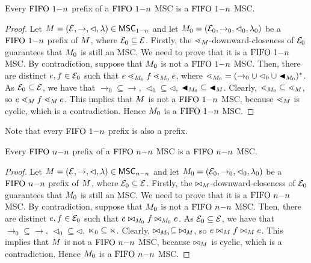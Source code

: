 \begin{lemma}
	\label{lem:onen-prefix}
	Every $\text{FIFO } 1\mathsf{-}n$ prefix of a $\text{FIFO } 1\mathsf{-}n$ MSC is a $\text{FIFO } 1\mathsf{-}n$ MSC.
\end{lemma}
\begin{proof}
	Let $M = (\mathcal{E}, \to, \lhd, \lambda) \in \mathsf{MSC}_{1\mathsf{-}n}$ and let $M_0 =
	(\mathcal{E}_0, \to_0, \lhd_0, \lambda_0)$ be a $\text{FIFO } 1\mathsf{-}n$ prefix of $M$, where $\mathcal{E}_0 \subseteq \mathcal{E}$. Firstly, the $\lessdot_M$-downward-closeness of $\mathcal{E}_0$ guarantees that ${M_0}$ is still an MSC. We need to prove that it is a $\text{FIFO } 1\mathsf{-}n$ MSC. By contradiction, suppose that $M_0$ is not a $\text{FIFO } 1\mathsf{-}n$ MSC. Then, there are distinct $e,f \in \mathcal{E}_0$ such that $e \lessdot_{M_0} f \lessdot_{M_0} e$, where $\lessdot_{M_0} = (\to_0 \cup \lhd_0 \cup \blacktriangleleft_{M_0})^\ast$. As $\mathcal{E}_0 \subseteq \mathcal{E}$, we have that ${\rightarrow_0} \subseteq {\rightarrow}$, ${\lhd_0} \subseteq {\lhd}$, ${\blacktriangleleft_{M_0}} \subseteq {\blacktriangleleft_M}$. Clearly, $\lessdot_{M_0} \subseteq \lessdot_M$, so $e \lessdot_M f \lessdot_M e$. This implies that $M$ is not a $\text{FIFO } 1\mathsf{-}n$ MSC, because $\lessdot_M$ is cyclic, which is a contradiction. Hence $M_0$ is a $\text{FIFO } 1\mathsf{-}n$ MSC.
\end{proof}

\noindent Note that every $\text{FIFO } 1\mathsf{-}n$ prefix is also a prefix.

\begin{lemma}
	\label{lem:nn-prefix}
	Every $\text{FIFO } n\mathsf{-}n$ prefix of a $\text{FIFO } n\mathsf{-}n$ MSC is a $\text{FIFO } n\mathsf{-}n$ MSC.
\end{lemma}
\begin{proof}
	Let $M = (\mathcal{E}, \to, \lhd, \lambda) \in \mathsf{MSC}_{n\mathsf{-}n}$ and let $M_0 =
	(\mathcal{E}_0, \to_0, \lhd_0, \lambda_0)$ be a $\text{FIFO } n\mathsf{-}n$ prefix of $M$, where $\mathcal{E}_0 \subseteq \mathcal{E}$. Firstly, the $\bowtie_M$-downward-closeness of $\mathcal{E}_0$ guarantees that ${M_0}$ is still an MSC. We need to prove that it is a $\text{FIFO } n\mathsf{-}n$ MSC. By contradiction, suppose that $M_0$ is not a $\text{FIFO } n\mathsf{-}n$ MSC. Then, there are distinct $e,f \in \mathcal{E}_0$ such that $e \bowtie_{M_0} f \bowtie_{M_0} e$. As $\mathcal{E}_0 \subseteq \mathcal{E}$, we have that ${\rightarrow_0} \subseteq {\rightarrow}$, ${\lhd_0} \subseteq {\lhd}$, ${\ltimes_0} \subseteq {\ltimes}$. Clearly, $\bowtie_{M_0} \subseteq\; \bowtie_M$, so $e \bowtie_M f \bowtie_M e$. This implies that $M$ is not a $\text{FIFO } n\mathsf{-}n$ MSC, because $\bowtie_M$ is cyclic, which is a contradiction. Hence $M_0$ is a $\text{FIFO } n\mathsf{-}n$ MSC.
\end{proof}

